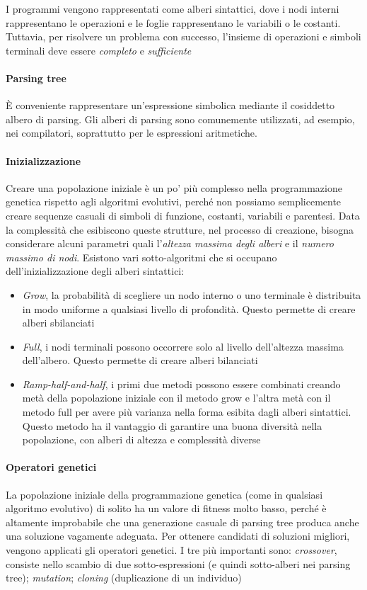 I programmi vengono rappresentati come alberi sintattici, dove i nodi interni rappresentano le operazioni e le foglie rappresentano le variabili o le costanti. Tuttavia, per risolvere un problema con successo, l'insieme di operazioni e simboli terminali deve essere \textit{completo} e \textit{sufficiente}

\paragraph{Parsing tree}
È conveniente rappresentare un'espressione simbolica mediante il cosiddetto albero di parsing. Gli alberi di parsing sono comunemente utilizzati, ad esempio, nei compilatori, soprattutto per le espressioni aritmetiche.

\paragraph{Inizializzazione}
Creare una popolazione iniziale è un po' più complesso nella programmazione genetica rispetto agli algoritmi evolutivi, perché non possiamo semplicemente creare sequenze casuali di simboli di funzione, costanti, variabili e parentesi. Data la complessità che esibiscono queste strutture, nel processo di creazione, bisogna considerare alcuni parametri quali l’\textit{altezza massima degli alberi} e il \textit{numero massimo di nodi}. Esistono vari sotto-algoritmi che si occupano dell’inizializzazione degli alberi sintattici:
\begin{itemize}
    \item \textit{Grow}, la probabilità di scegliere un nodo interno o uno terminale è distribuita in modo uniforme a qualsiasi livello di profondità. Questo permette di creare alberi sbilanciati
    \item \textit{Full}, i nodi terminali possono occorrere solo al livello dell’altezza massima dell’albero. Questo permette di creare alberi bilanciati
    \item \textit{Ramp-half-and-half}, i primi due metodi possono essere combinati creando metà della popolazione iniziale con il metodo grow e l'altra metà con il metodo full per avere più varianza nella forma esibita dagli alberi sintattici.  Questo metodo ha il vantaggio di garantire una buona diversità nella popolazione, con alberi di altezza e complessità diverse
\end{itemize}

\paragraph{Operatori genetici}
La popolazione iniziale della programmazione genetica (come in qualsiasi algoritmo evolutivo) di solito ha un valore di fitness molto basso, perché è altamente improbabile che una generazione casuale di parsing tree produca anche una soluzione vagamente adeguata. Per ottenere candidati di soluzioni migliori, vengono applicati gli operatori genetici. I tre più importanti sono: \textit{crossover}, consiste nello scambio di due sotto-espressioni (e quindi sotto-alberi nei parsing tree); \textit{mutation}; \textit{cloning} (duplicazione di un individuo)

